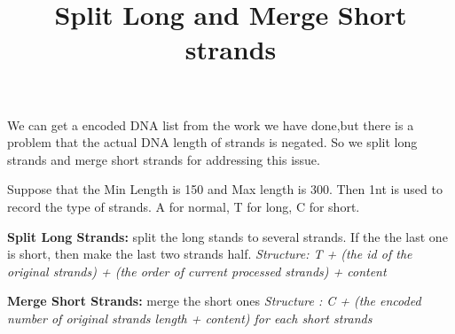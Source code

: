 \documentclass{article}
\title{Split Long and Merge Short strands}
\begin{document}
    \maketitle
    We can get a encoded DNA list from the work we have done,but there is a problem that the actual DNA length of strands is negated. So we split long strands and merge short strands for addressing this issue.
    \par Suppose that the Min Length is 150 and Max length is 300. Then 1nt is used to record the type of strands. A for normal, T for long, C for short.
    \par 
    \textbf{Split Long Strands:} split the long stands to several strands. If the the last one is short, then make the last two strands half.
    \emph{Structure: T + (the id of the original strands) + (the order of current processed strands) + content}
    \par 
    \textbf{Merge Short Strands:} merge the short ones
    \emph{Structure : C + (the encoded number of original strands length + content) for each short strands}
\end{document}
